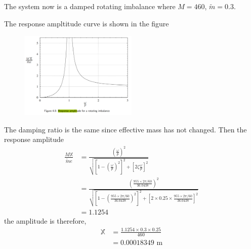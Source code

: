 \subsection{}
\subsubsection{}
The system now is a damped rotating imbalance where $M = 460$, $\tilde{m} = 0.3$.

The response ampltitude curve is shown in the figure
\begin{figure}[h]
    \centering
    \includegraphics[width=0.5\textwidth]{Questions/Figures/q4 response ampltiude.png}
\end{figure}
\FloatBarrier
The damping ratio is the same since effective mass has not changed.
Then the response amplitude
\begin{align*}
    \frac{M \mathbb{X}}{\tilde{m} e} &= \frac{\left(\frac{\omega}{p}\right)^2}{\sqrt{\left[1 - \left(\frac{\omega}{p}\right)^2\right]^2 + \left[2 \zeta \frac{\omega}{p}\right]^2}} \\
    &= \frac{\left(\frac{955 \times 2\pi/60}{36.0438}\right)^2}{\sqrt{\left[1 - \left(\frac{955 \times 2\pi/60}{36.0438}\right)^2\right]^2 + \left[2 \times 0.25 \times \frac{955 \times 2\pi/60}{36.0438}\right]^2}} \\
    &= \boxed{1.1254}
\end{align*}
the amplitude is therefore,
\begin{align*}
    \mathbb{X} &= \frac{1.1254 \times 0.3 \times 0.25}{460} \\
    &= \boxed{0.00018349 \text{ m}}
\end{align*}

